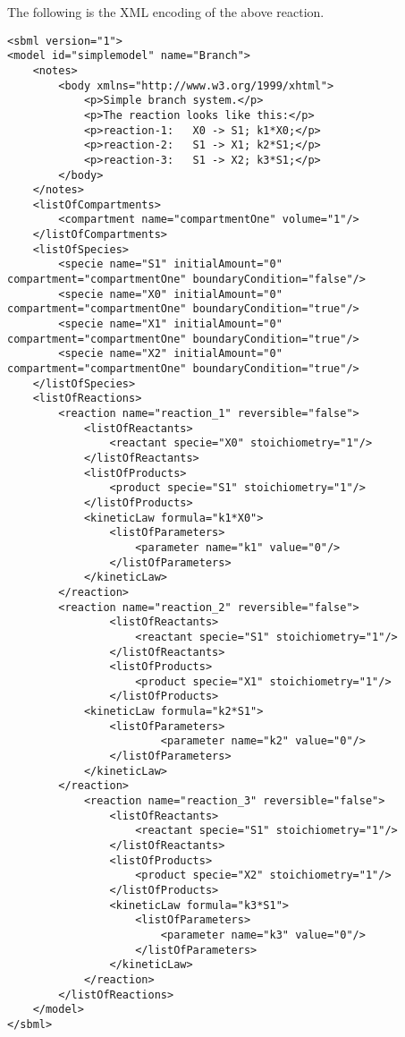 \documentclass[10pt]{article}
\newcommand{\tightspacing}{\renewcommand{\baselinestretch}{0.85}}
\newcommand{\regularspacing}{\renewcommand{\baselinestretch}{1.0}}
\begin{document}
The following is the XML encoding of the above reaction.

\begin{small}
\tightspacing
\begin{verbatim}
<sbml version="1">
<model id="simplemodel" name="Branch">
    <notes>
        <body xmlns="http://www.w3.org/1999/xhtml">
            <p>Simple branch system.</p>
            <p>The reaction looks like this:</p>
            <p>reaction-1:   X0 -> S1; k1*X0;</p>
            <p>reaction-2:   S1 -> X1; k2*S1;</p>
            <p>reaction-3:   S1 -> X2; k3*S1;</p>
        </body>
    </notes>
    <listOfCompartments>
        <compartment name="compartmentOne" volume="1"/>
    </listOfCompartments>
    <listOfSpecies>
        <specie name="S1" initialAmount="0" compartment="compartmentOne" boundaryCondition="false"/>
        <specie name="X0" initialAmount="0" compartment="compartmentOne" boundaryCondition="true"/>
        <specie name="X1" initialAmount="0" compartment="compartmentOne" boundaryCondition="true"/>
        <specie name="X2" initialAmount="0" compartment="compartmentOne" boundaryCondition="true"/>
    </listOfSpecies>
    <listOfReactions>
        <reaction name="reaction_1" reversible="false">
            <listOfReactants>
                <reactant specie="X0" stoichiometry="1"/>
            </listOfReactants>
            <listOfProducts>
                <product specie="S1" stoichiometry="1"/>
            </listOfProducts>
            <kineticLaw formula="k1*X0">
                <listOfParameters>
                    <parameter name="k1" value="0"/>
                </listOfParameters>
            </kineticLaw>
        </reaction>
        <reaction name="reaction_2" reversible="false">
                <listOfReactants>
                    <reactant specie="S1" stoichiometry="1"/>
                </listOfReactants>
                <listOfProducts>
                    <product specie="X1" stoichiometry="1"/>
                </listOfProducts>
            <kineticLaw formula="k2*S1">
                <listOfParameters>
                        <parameter name="k2" value="0"/>
                </listOfParameters>
            </kineticLaw>
        </reaction>
            <reaction name="reaction_3" reversible="false">
                <listOfReactants>
                    <reactant specie="S1" stoichiometry="1"/>
                </listOfReactants>
                <listOfProducts>
                    <product specie="X2" stoichiometry="1"/>
                </listOfProducts>
                <kineticLaw formula="k3*S1">
                    <listOfParameters>
                        <parameter name="k3" value="0"/>
                    </listOfParameters>
                </kineticLaw>
            </reaction>
        </listOfReactions>
    </model>
</sbml>

\end{verbatim}
  \regularspacing
\end{small}
\end{document}
